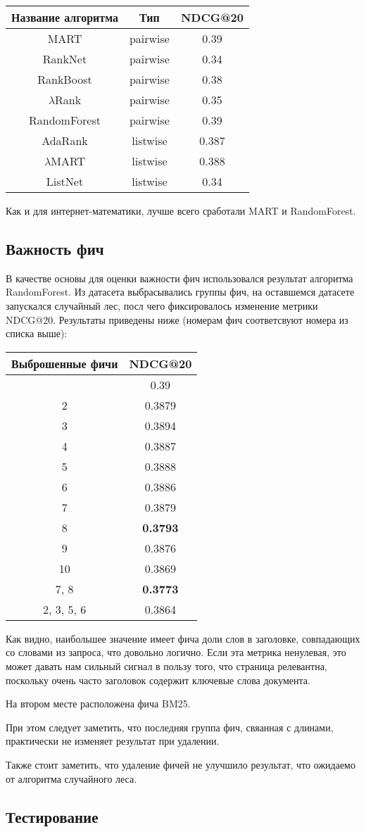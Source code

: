 \begin{tabular}{|c|c|c|}
	\hline
	
	Название алгоритма & Тип& NDCG@20\\
	\hline
	MART & pairwise & 0.39\\
	RankNet & pairwise & 0.34\\
	RankBoost & pairwise & 0.38\\
	$\lambda$Rank & pairwise & 0.35\\
	RandomForest& pairwise & 0.39\\
	\hline
	AdaRank & listwise & 0.387\\
	$\lambda$MART & listwise & 0.388\\
	ListNet & listwise & 0.34\\
	\hline
\end{tabular}

Как и для интернет-математики, лучше всего сработали MART и RandomForest.

\subsection{Важность фич}

В качестве основы для оценки важности фич использовался результат алгоритма RandomForest. Из датасета выбрасывались группы фич, на оставшемся датасете запускался случайный лес, посл чего фиксировалось изменение метрики NDCG@20. Результаты приведены ниже (номерам фич соответсвуют номера из списка выше):

\begin{tabular}{|c|c|}
	\hline
	
	Выброшенные фичи & NDCG@20\\
	\hline
	& 0.39 \\
	\hline
	2& 0.3879 \\
	3& 0.3894 \\
	4& 0.3887 \\
	5& 0.3888 \\
	6& 0.3886 \\
	7& 0.3879 \\
	8& {\bf 0.3793} \\
	9& 0.3876 \\
	10& 0.3869 \\
	7, 8&  {\bf 0.3773} \\
	2, 3, 5, 6& 0.3864 \\
	\hline
\end{tabular} 

Как видно, наибольшее значение имеет фича доли слов в заголовке, совпадающих со словами из запроса, что довольно логично. Если эта метрика ненулевая, это может давать нам сильный сигнал в пользу того, что страница релевантна, поскольку очень часто заголовок содержит ключевые слова документа.

На втором месте расположена фича BM25.

При этом следует заметить, что последняя группа фич, свяанная с длинами, практически не изменяет результат при удалении.

Также стоит заметить, что удаление фичей не улучшило результат, что ожидаемо от алгоритма случайного леса.

\subsection{Тестирование}